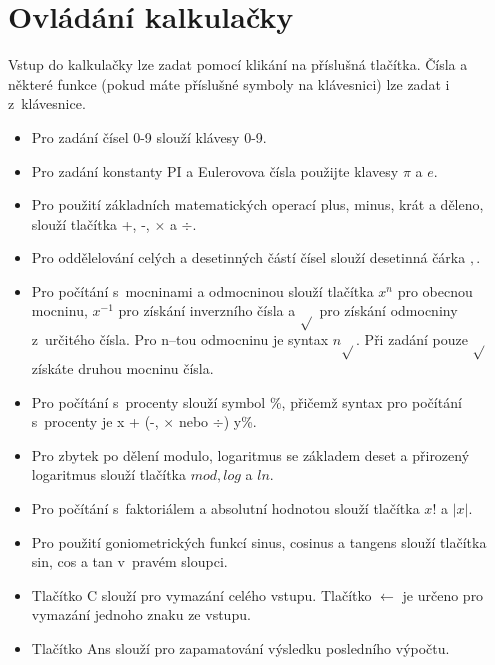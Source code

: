 \documentclass[12pt]{article}
\begin{document}
\section{Ovládání kalkulačky}
Vstup do kalkulačky lze zadat pomocí klikání na příslušná tlačítka. Čísla a některé funkce (pokud máte příslušné symboly na klávesnici) lze zadat i z~klávesnice.
\begin{itemize}
\item Pro zadání čísel 0-9 slouží klávesy 0-9.
\item Pro zadání konstanty PI a Eulerovova čísla použijte klavesy $\pi$ a $e$.
\item Pro použití základních matematických operací plus, minus, krát a děleno, slouží tlačítka +, -, $\times$ a $\div$.
\item Pro oddělelování celých a desetinných částí čísel slouží desetinná čárka $,$.
\item Pro počítání s~mocninami a odmocninou slouží tlačítka $x^n$ pro obecnou mocninu, $x^{-1}$ pro získání inverzního čísla a $\sqrt{}$ pro získání odmocniny z~určitého čísla. Pro n--tou odmocninu je syntax $n\sqrt{}$. Při zadání pouze $\sqrt{}$ získáte druhou mocninu čísla.
\item Pro počítání s~procenty slouží symbol \%, přičemž syntax pro počítání s~procenty je x +  (-, $\times$ nebo $\div$) y\%.
\item Pro zbytek po dělení modulo, logaritmus se základem deset a přirozený logaritmus slouží tlačítka $mod, log$ a $ln$.
\item Pro počítání s~faktoriálem a absolutní hodnotou slouží tlačítka $x!$ a $|x|$.
\item Pro použití goniometrických funkcí sinus, cosinus a tangens slouží tlačítka sin, cos a tan v~pravém sloupci.
\item Tlačítko C slouží pro vymazání celého vstupu. Tlačítko $\longleftarrow$ je určeno pro vymazání jednoho znaku ze vstupu.
\item Tlačítko Ans slouží pro zapamatování výsledku posledního výpočtu.
\end{itemize}
\end{document}
